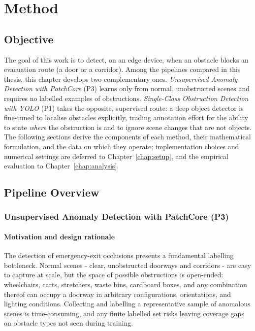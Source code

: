 \chapter{Method}
\label{chap:method}

\section{Objective}

The goal of this work is to detect, on an edge device, when an obstacle blocks
an evacuation route (a door or a corridor). Among the pipelines compared in this
thesis, this chapter develops two complementary ones.
\emph{Unsupervised Anomaly Detection with PatchCore} (P3) learns only from
normal, unobstructed scenes and requires no labelled examples of obstructions.
\emph{Single-Class Obstruction Detection with YOLO} (P1) takes the opposite,
supervised route: a deep object detector is fine-tuned to localise obstacles
explicitly, trading annotation effort for the ability to state \emph{where} the
obstruction is and to ignore scene changes that are not objects. The following
sections derive the components of each method, their mathematical formulation,
and the data on which they operate; implementation choices and numerical
settings are deferred to Chapter~\ref{chap:setup}, and the empirical evaluation
to Chapter~\ref{chap:analysis}.

\section{Pipeline Overview}

\subsection{Unsupervised Anomaly Detection with PatchCore (P3)}

\subsubsection{Motivation and design rationale}

The detection of emergency-exit occlusions presents a fundamental labelling
bottleneck. Normal scenes - clear, unobstructed doorways and corridors - are
easy to capture at scale, but the space of possible obstructions is open-ended:
wheelchairs, carts, stretchers, waste bins, cardboard boxes, and any combination
thereof can occupy a doorway in arbitrary configurations, orientations, and
lighting conditions. Collecting and labelling a representative sample of
anomalous scenes is time-consuming, and any finite labelled set risks leaving
coverage gaps on obstacle types not seen during training.

